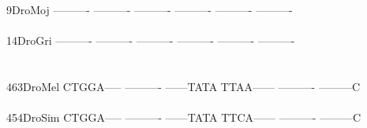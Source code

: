 \documentclass[11pt,twoside,reqno,a4paper]{article}
\begin{document}
{9\hspace*{4\charwidth}DroMoj	----------	----------	----------	----------	----------	----------	\\
\hspace*{5\charwidth}\hspace*{7\charwidth}\hspace*{1\charwidth}\hspace*{1\charwidth}\hspace*{1\charwidth}\hspace*{1\charwidth}\hspace*{1\charwidth}\hspace*{1\charwidth}\\
14\hspace*{3\charwidth}DroGri	----------	----------	----------	----------	----------	----------	\\
\hspace*{5\charwidth}\hspace*{7\charwidth}\hspace*{1\charwidth}\hspace*{1\charwidth}\hspace*{1\charwidth}\hspace*{1\charwidth}\hspace*{1\charwidth}\hspace*{1\charwidth}\\
\\
463\hspace*{2\charwidth}DroMel	CTGGA-----	----------	------TATA	TTAA------	----------	---------C	\\
\hspace*{5\charwidth}\hspace*{7\charwidth}\hspace*{1\charwidth}\hspace*{1\charwidth}\hspace*{1\charwidth}\hspace*{1\charwidth}\hspace*{1\charwidth}\hspace*{1\charwidth}\\
454\hspace*{2\charwidth}DroSim	CTGGA-----	----------	------TATA	TTCA------	----------	---------C	\\
\hspace*{5\charwidth}\hspace*{7\charwidth}\hspace*{1\charwidth}\hspace*{1\charwidth}\hspace*{1\charwidth}\hspace*{1\charwidth}\hspace*{1\charwidth}\hspace*{1\charwidth}\\
}
\end{document}

